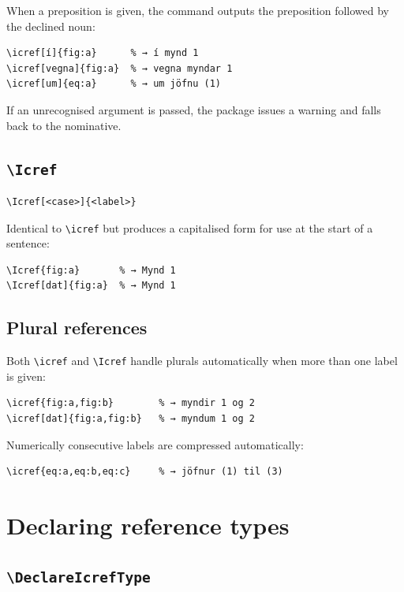\documentclass{article}
\begin{document}
When a preposition is given, the command outputs the preposition
followed by the declined noun:

\begin{lstlisting}
\icref[í]{fig:a}      % → í mynd 1
\icref[vegna]{fig:a}  % → vegna myndar 1
\icref[um]{eq:a}      % → um jöfnu (1)
\end{lstlisting}

If an unrecognised argument is passed, the package issues a warning and
falls back to the nominative.

\subsection{\texttt{\textbackslash Icref}}

\begin{lstlisting}
\Icref[<case>]{<label>}
\end{lstlisting}

Identical to \verb|\icref| but produces a capitalised form for use at
the start of a sentence:

\begin{lstlisting}
\Icref{fig:a}       % → Mynd 1
\Icref[dat]{fig:a}  % → Mynd 1
\end{lstlisting}

\subsection{Plural references}

Both \verb|\icref| and \verb|\Icref| handle plurals automatically when
more than one label is given:

\begin{lstlisting}
\icref{fig:a,fig:b}        % → myndir 1 og 2
\icref[dat]{fig:a,fig:b}   % → myndum 1 og 2
\end{lstlisting}

Numerically consecutive labels are compressed automatically:

\begin{lstlisting}
\icref{eq:a,eq:b,eq:c}     % → jöfnur (1) til (3)
\end{lstlisting}

\section{Declaring reference types}

\subsection{\texttt{\textbackslash DeclareIcrefType}}
\end{document}

